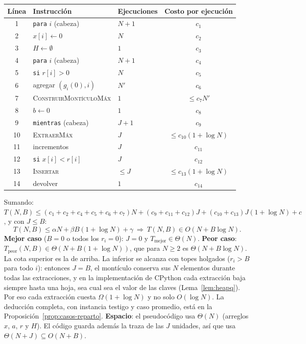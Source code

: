 \begin{center}
\small
\begin{tabular}{@{}cllc@{}}
\toprule
Línea & Instrucción & Ejecuciones & Costo por ejecución\\
\midrule
1 & \texttt{para} $i$ (cabeza) & $N+1$ & $c_1$\\
2 & $x[i]\gets0$ & $N$ & $c_2$\\
3 & $H\gets\emptyset$ & $1$ & $c_3$\\
4 & \texttt{para} $i$ (cabeza) & $N+1$ & $c_4$\\
5 & \texttt{si} $r[i]>0$ & $N$ & $c_5$\\
6 & agregar $(g_i(0),i)$ & $N'$ & $c_6$\\
7 & \textsc{ConstruirMontículoMáx} & $1$ & $\le c_7N'$\\
8 & $b\gets0$ & $1$ & $c_8$\\
9 & \texttt{mientras} (cabeza) & $J+1$ & $c_9$\\
10 & \textsc{ExtraerMáx} & $J$ & $\le c_{10}(1+\log N)$\\
11 & incrementos & $J$ & $c_{11}$\\
12 & \texttt{si} $x[i]<r[i]$ & $J$ & $c_{12}$\\
13 & \textsc{Insertar} & $\le J$ & $\le c_{13}(1+\log N)$\\
14 & devolver & $1$ & $c_{14}$\\
\bottomrule
\end{tabular}
\end{center}
Sumando: $T(N,B)\le(c_1+c_2+c_4+c_5+c_6+c_7)N+(c_9+c_{11}+c_{12})J+(c_{10}+c_{13})J(1+\log N)+c$, y con $J\le B$:
\[
T(N,B)\le \alpha N+\beta B(1+\log N)+\gamma\ \Longrightarrow\ T(N,B)\in O(N+B\log N).
\]
\textbf{Mejor caso} ($B=0$ o todos los $r_i=0$): $J=0$ y $T_{\text{mejor}}\in\Theta(N)$. \textbf{Peor caso}: $T_{\text{peor}}(N,B)\in\Theta(N+B(1+\log N))$, que para $N\ge2$ es $\Theta(N+B\log N)$. La cota superior es la de arriba. La inferior se alcanza con topes holgados ($r_i>B$ para todo $i$): entonces $J=B$, el montículo conserva sus $N$ elementos durante todas las extracciones, y en la implementación de CPython cada extracción baja siempre hasta una hoja, sea cual sea el valor de las claves (Lema~\ref{lem:heapq}). Por eso cada extracción cuesta $\Omega(1+\log N)$ y no solo $O(\log N)$. La deducción completa, con instancia testigo y caso promedio, está en la Proposición~\ref{prop:casos-reparto}. \textbf{Espacio}: el pseudocódigo usa $\Theta(N)$ (arreglos $x$, $a$, $r$ y $H$). El código guarda además la traza de las $J$ unidades, así que usa $\Theta(N+J)\subseteq O(N+B)$.

